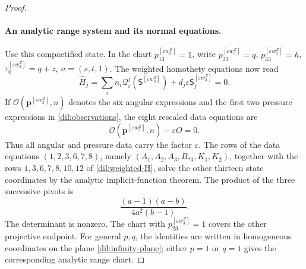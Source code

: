 \documentclass[11pt,a4paper]{article}
\numberwithin{equation}{section}
\theoremstyle{plain}
\theoremstyle{definition}
\theoremstyle{remark}
\begin{document}
\begin{proof}
\paragraph{An analytic range system and its normal equations.}
Use this compactified state. In the chart $p_{13}^{[\varepsilon w_3^Z]}=1$, write
$p_{23}^{[\varepsilon w_3^Z]}=q$, $p_{33}^{[\varepsilon w_3^Z]}=h$, $\tau_0^{[\varepsilon w_3^Z]}=q+z$, $n=(s,t,1)$.
The weighted homothety equations now read
\begin{equation}\label{dil:weighted-H}
\widehat H_j=\sum_i n_i\mathcal Q_i^j(\mathsf S^{[\varepsilon w_3^Z]})
                  +d_j\varepsilon\mathsf S^{[\varepsilon w_3^Z]}_j=0.
\end{equation}
If $\mathscr O(\boldsymbol p^{[\varepsilon w_3^Z]},n)$ denotes the six angular expressions and the
first two pressure expressions in \eqref{dil:observations}, the eight
rescaled data equations are
\[
                       \mathscr O(\boldsymbol p^{[\varepsilon w_3^Z]},n)-\varepsilon O=0.
\]
Thus all angular and pressure data carry the factor $\varepsilon$.
The rows of the data equations $(1,2,3,6,7,8)$, namely
$(A_1,A_2,A_3,B_{*3},K_1,K_2)$,
together with the rows
$1,3,6,7,8,10,12$ of \eqref{dil:weighted-H}, solve the other thirteen
state coordinates by the analytic implicit-function theorem.  The
product of the three successive pivots is
\begin{equation}\label{dil:range-minor}
              \frac{(a-1)(a-b)}{4a^2(b-1)}.
\end{equation}
The determinant is nonzero.  The chart with
$p_{23}^{[\varepsilon w_3^Z]}=1$ covers the other projective endpoint.
For general $p,q$, the identities are written in homogeneous coordinates on the plane
\eqref{dil:infinity-plane}; either $p=1$ or $q=1$ gives the
corresponding analytic range chart.


\end{proof}
\end{document}
